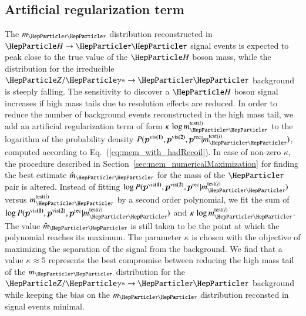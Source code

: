 \subsection{Artificial regularization term}
\label{sec:mem_logM}

The $m_{\Pgt\Pgt}$ distribution reconstructed in $\PHiggs \to \Pgt\Pgt$ signal events is expected to peak close to the true value of the $\PHiggs$ boson mass,
while the distribution for the irreducible $\PZ/\Pggx \to \Pgt\Pgt$ background is steeply falling.
The sensitivity to discover a $\PHiggs$ boson signal increases if high mass tails due to resolution effects are reduced.
In order to reduce the number of background events reconstructed in the high mass tail,
we add an artificial regularization term of form $\kappa \, \log m_{\Pgt\Pgt}^{\textrm{test}(i)}$ to the logarithm of the probability density $P(\bm{p^{\vis(1)}},\bm{p^{\vis(2)}},\bm{p^{\rec}}|m_{\Pgt\Pgt}^{\textrm{test}(i)})$, 
computed according to Eq.~(\ref{eq:mem_with_hadRecoil}).
In case of non-zero $\kappa$,
the procedure described in Section~\ref{sec:mem_numericalMaximization} for finding the best estimate $\hat{m}_{\Pgt\Pgt}$ for the mass of the $\Pgt$ pair is altered.
Instead of fitting $\log P(\bm{p^{\vis(1)}},\bm{p^{\vis(2)}},\bm{p^{\rec}}|m_{\Pgt\Pgt}^{\textrm{test}(i)})$ versus $m_{\Pgt\Pgt}^{\textrm{test}(i)}$ by a second order polynomial,
we fit the sum of $\log P(\bm{p^{\vis(1)}},\bm{p^{\vis(2)}},\bm{p^{\rec}}|m_{\Pgt\Pgt}^{\textrm{test}(i)})$ and $\kappa \, \log m_{\Pgt\Pgt}^{\textrm{test}(i)}$.
The value $\hat{m}_{\Pgt\Pgt}$ 
is still taken to be the point at which the polynomial reaches its maximum.
The parameter $\kappa$ is chosen with the objective of maximizing the separation of the signal from the background.
We find that a value $\kappa \approx 5$ represents the best compromise between reducing the high mass tail of the $m_{\Pgt\Pgt}$ distribution 
for the $\PZ/\Pggx \to \Pgt\Pgt$ background while keeping the bias on the $m_{\Pgt\Pgt}$ distribution reconsted in signal events minimal.
